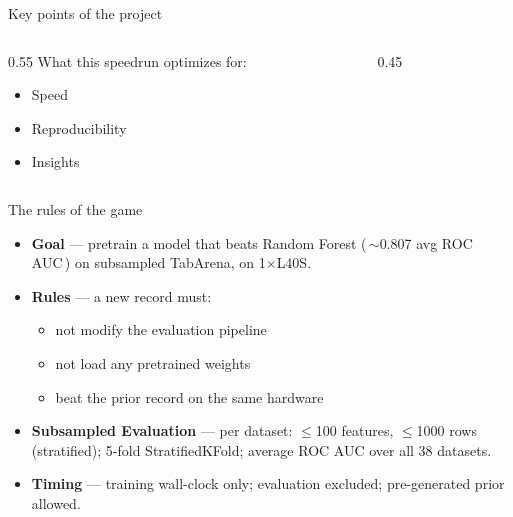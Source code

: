 \documentclass[aspectratio=169,10pt]{beamer}
\newcommand{\hl}[1]{{\color{accent}\textbf{#1}}}
\begin{document}
\begin{frame}{Key points of the project}
  \begin{columns}[c]
    \begin{column}{0.55\textwidth}
      What this speedrun optimizes for:
      \begin{itemize}
        \item Speed
        \medskip
        \item Reproducibility
        \medskip
        \item Insights
      \end{itemize}
    \end{column}
    \begin{column}{0.45\textwidth}
      \centering
    \end{column}
  \end{columns}
\end{frame}

\begin{frame}{The rules of the game}
  \begin{itemize}
    \item \hl{Goal} --- pretrain a model that beats Random Forest (\,$\sim$0.807 avg ROC AUC\,) on subsampled TabArena, on 1$\times$L40S.
    \medskip
    \item \hl{Rules} --- a new record must:
    \begin{itemize}
      \item not modify the evaluation pipeline
      \item not load any pretrained weights
      \item beat the prior record on the same hardware
    \end{itemize}
    \medskip
    \item \hl{Subsampled Evaluation} --- per dataset: $\le$100 features, $\le$1000 rows (stratified); 5-fold StratifiedKFold; average ROC AUC over all 38 datasets.
    \medskip
    \item \hl{Timing} --- training wall-clock only; evaluation excluded; pre-generated prior allowed.
  \end{itemize}
\end{frame}
\end{document}
